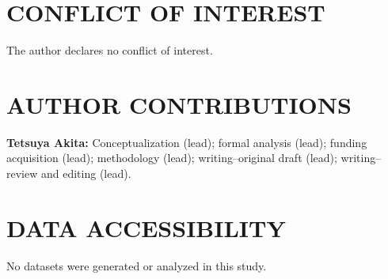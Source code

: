 \documentclass[12pt, English]{article}
\begin{document}
\begin{spacing}{1.9}
\section*{CONFLICT OF INTEREST}
The author declares no conflict of interest.

\section*{AUTHOR CONTRIBUTIONS}
{\bf Tetsuya Akita:} Conceptualization (lead); formal analysis (lead); funding acquisition (lead); methodology (lead); writing--original draft (lead); writing--review and editing (lead).

\section*{DATA ACCESSIBILITY}
No datasets were generated or analyzed in this study.




\clearpage


\end{spacing}
\end{document}
